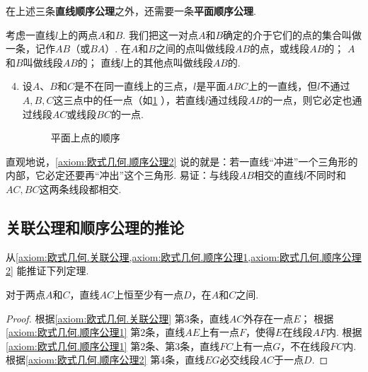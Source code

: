 在上述三条{\bf 直线顺序公理}之外，还需要一条{\bf 平面顺序公理}.

\begin{axiom}[顺序公理II]\label{axiom:欧式几何.顺序公理2}
考虑一直线\(l\)上的两点\(A\)和\(B\).
我们把这一对点\(A\)和\(B\)确定的介于它们的点的集合叫做一条，记作\(AB\)（或\(BA\)）.
在\(A\)和\(B\)之间的点叫做线段\(AB\)的点，或线段\(AB\)的；
\(A\)和\(B\)叫做线段\(AB\)的；
直线\(l\)上的其他点叫做线段\(AB\)的.
\begin{enumerate}
\setcounter{enumi}{3}
\item 设\(A\)、\(B\)和\(C\)是不在同一直线上的三点，\(l\)是平面\(ABC\)上的一直线，但\(l\)不通过\(A,B,C\)这三点中的任一点（如\cref{figure:欧式几何.平面上点的顺序1} ），若直线\(l\)通过线段\(AB\)的一点，则它必定也通过线段\(AC\)或线段\(BC\)的一点.
\begin{figure}[ht]
\centering
{}
\caption{平面上点的顺序}
\label{figure:欧式几何.平面上点的顺序1}
\end{figure}
\end{enumerate}
\end{axiom}
直观地说，\cref{axiom:欧式几何.顺序公理2} 说的就是：若一直线“冲进”一个三角形的内部，它必定还要再“冲出”这个三角形.
易证：与线段\(AB\)相交的直线\(l\)不同时和\(AC,BC\)这两条线段都相交.

\subsection{关联公理和顺序公理的推论}
从\cref{axiom:欧式几何.关联公理,axiom:欧式几何.顺序公理1,axiom:欧式几何.顺序公理2} 能推证下列定理.
\begin{theorem}\label{theorem:欧式几何.定理3}
对于两点\(A\)和\(C\)，直线\(AC\)上恒至少有一点\(D\)，在\(A\)和\(C\)之间.
\begin{proof}
根据\cref{axiom:欧式几何.关联公理} 第3条，直线\(AC\)外存在一点\(E\)；
根据\cref{axiom:欧式几何.顺序公理1} 第2条，直线\(AE\)上有一点\(F\)，使得\(E\)在线段\(AF\)内.
根据\cref{axiom:欧式几何.顺序公理1} 第2条、第3条，直线\(FC\)上有一点\(G\)，不在线段\(FC\)内.
根据\cref{axiom:欧式几何.顺序公理2} 第4条，直线\(EG\)必交线段\(AC\)于一点\(D\).
\end{proof}
\end{theorem}

